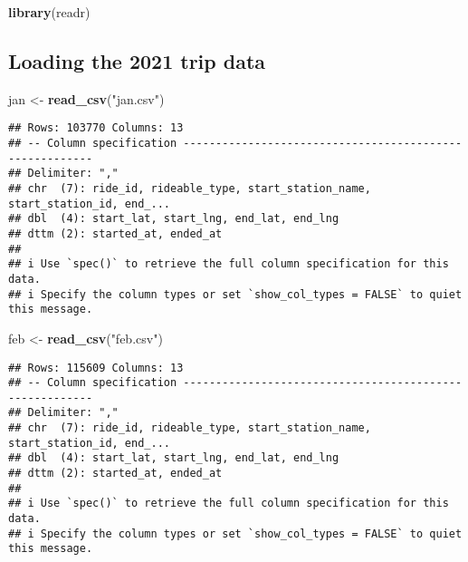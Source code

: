 \documentclass[
]{article}
\newenvironment{Shaded}{\begin{snugshade}}{\end{snugshade}}
\newcommand{\FunctionTok}[1]{\textcolor[rgb]{0.13,0.29,0.53}{\textbf{#1}}}
\newcommand{\NormalTok}[1]{#1}
\newcommand{\OtherTok}[1]{\textcolor[rgb]{0.56,0.35,0.01}{#1}}
\newcommand{\StringTok}[1]{\textcolor[rgb]{0.31,0.60,0.02}{#1}}
\begin{document}
\begin{Shaded}
\begin{Highlighting}[]
\FunctionTok{library}\NormalTok{(readr)}
\end{Highlighting}
\end{Shaded}

\hypertarget{loading-the-2021-trip-data}{%
\subsection{Loading the 2021 trip
data}\label{loading-the-2021-trip-data}}

\begin{Shaded}
\begin{Highlighting}[]
\NormalTok{jan }\OtherTok{\textless{}{-}} \FunctionTok{read\_csv}\NormalTok{(}\StringTok{"jan.csv"}\NormalTok{)}
\end{Highlighting}
\end{Shaded}

\begin{verbatim}
## Rows: 103770 Columns: 13
## -- Column specification --------------------------------------------------------
## Delimiter: ","
## chr  (7): ride_id, rideable_type, start_station_name, start_station_id, end_...
## dbl  (4): start_lat, start_lng, end_lat, end_lng
## dttm (2): started_at, ended_at
## 
## i Use `spec()` to retrieve the full column specification for this data.
## i Specify the column types or set `show_col_types = FALSE` to quiet this message.
\end{verbatim}

\begin{Shaded}
\begin{Highlighting}[]
\NormalTok{feb }\OtherTok{\textless{}{-}} \FunctionTok{read\_csv}\NormalTok{(}\StringTok{"feb.csv"}\NormalTok{)}
\end{Highlighting}
\end{Shaded}

\begin{verbatim}
## Rows: 115609 Columns: 13
## -- Column specification --------------------------------------------------------
## Delimiter: ","
## chr  (7): ride_id, rideable_type, start_station_name, start_station_id, end_...
## dbl  (4): start_lat, start_lng, end_lat, end_lng
## dttm (2): started_at, ended_at
## 
## i Use `spec()` to retrieve the full column specification for this data.
## i Specify the column types or set `show_col_types = FALSE` to quiet this message.
\end{verbatim}
\end{document}
